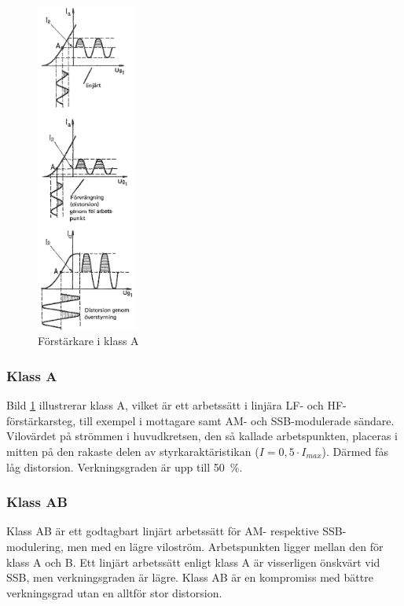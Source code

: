 \begin{figure}
\includegraphics[width=0.3\textwidth]{images/cropped_pdfs/bild_2_3-44.pdf}
\caption{Förstärkare i klass A}
\label{fig:BildII3-44}
\end{figure}

\subsubsection{Klass A}

Bild \ref{fig:BildII3-44} illustrerar klass A, vilket är ett arbetssätt i linjära
LF- och HF-förstärkarsteg, till exempel i mottagare samt AM- och SSB-modulerade
sändare.
Vilovärdet på strömmen i huvudkretsen, den så kallade arbetspunkten, placeras i
mitten på den rakaste delen av styrkaraktäristikan (\(I=0,5\cdot I_{max}\)).
Därmed fås låg distorsion.
Verkningsgraden är upp till 50~\%.

\subsubsection{Klass AB}

Klass AB är ett godtagbart linjärt arbetssätt för AM- respektive SSB-modulering,
men med en lägre viloström.
Arbetspunkten ligger mellan den för klass A och B.
Ett linjärt arbetssätt enligt klass A är visserligen önskvärt vid SSB, men
verkningsgraden är lägre.
Klass AB är en kompromiss med bättre verkningsgrad utan en alltför stor
distorsion.

